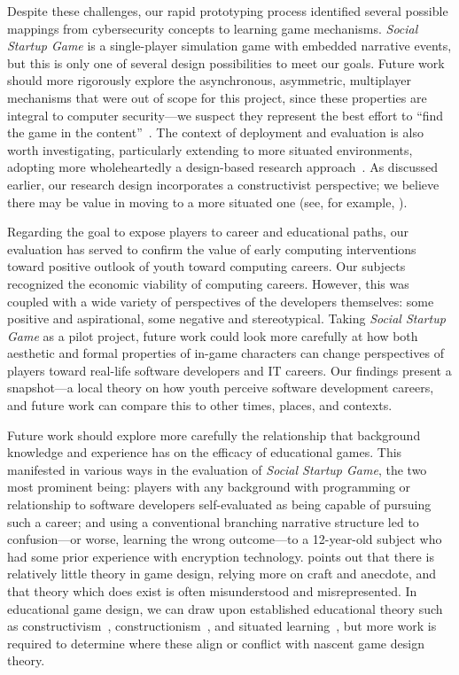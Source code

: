 \documentclass[letterpaper]{article}
\begin{document}
Despite these challenges, our rapid prototyping process identified
several possible mappings from cybersecurity concepts to learning game
mechanisms.  
\textit{Social Startup Game} is a single-player simulation game
with embedded narrative events, but this is only one of several
design possibilities to meet our goals.
Future work should more rigorously explore the
asynchronous, asymmetric, multiplayer mechanisms that were out of
scope for this project, since these properties are integral to
computer security---we suspect they represent the best effort to
``find the game in the content''~\citep{Klopfer2009}.  The context of
deployment and evaluation is also worth investigating, particularly
extending to more situated environments, adopting more wholeheartedly
a design-based research approach~\citep{Brown1992,Barab2004}.  As
discussed earlier, our research design incorporates a constructivist
perspective; we believe there may be value in moving to a more
situated one (see, for example, \citet{Greeno1998, Hickey2003}).

Regarding the goal to expose players to career and educational paths,
our evaluation has served to 
confirm the value of early computing interventions toward positive
outlook of youth toward computing careers.
Our subjects recognized the economic viability of computing careers.
However, this was coupled with a wide variety of perspectives
of the developers themselves: some positive and aspirational, some
negative and stereotypical.
Taking \textit{Social Startup Game} as a pilot project, future work
could look more carefully at how both aesthetic and formal properties
of in-game characters can change perspectives of players toward
real-life software developers and IT careers.
Our findings present a snapshot---a local theory on how youth perceive
software development careers, and future work can compare this to 
other times, places, and contexts.

Future work should explore more carefully the relationship that
background knowledge and experience has on the efficacy of 
educational games. This manifested in various ways in the evaluation
of \textit{Social Startup Game}, the two most prominent being:
players with any background with programming or relationship to 
software developers self-evaluated as being  capable of pursuing
such a career; and using a conventional branching narrative structure
led to confusion---or worse, learning the wrong outcome---to a 12-year-old
subject who had some prior experience with encryption technology.
\citet{Bartle2009} points out that there is relatively little theory
in game design, relying more on craft and anecdote, and that theory
which does exist is often misunderstood and misrepresented.
In educational game design, we can draw upon established educational
theory such as constructivism~\citep{Duffy1996},
constructionism~\citep{Papert1991},
and situated learning~\citep{Wenger1999},
but more work is required to determine where these align or
conflict with nascent game design theory.
\end{document}
